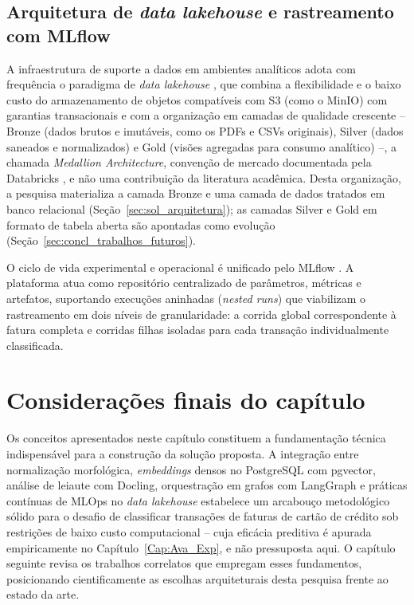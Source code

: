 \subsection{Arquitetura de \textit{data lakehouse} e rastreamento com MLflow}
A infraestrutura de suporte a dados em ambientes analíticos adota com frequência o paradigma de \textit{data lakehouse} \cite{armbrust2021lakehouse}, que combina a flexibilidade e o baixo custo do armazenamento de objetos compatíveis com S3 (como o MinIO) com garantias transacionais e com a organização em camadas de qualidade crescente -- Bronze (dados brutos e imutáveis, como os PDFs e CSVs originais), Silver (dados saneados e normalizados) e Gold (visões agregadas para consumo analítico) --, a chamada \textit{Medallion Architecture}, convenção de mercado documentada pela Databricks \cite{databricks2026medallion}, e não uma contribuição da literatura acadêmica. Desta organização, a pesquisa materializa a camada Bronze e uma camada de dados tratados em banco relacional (Seção~\ref{sec:sol_arquitetura}); as camadas Silver e Gold em formato de tabela aberta são apontadas como evolução (Seção~\ref{sec:concl_trabalhos_futuros}).

O ciclo de vida experimental e operacional é unificado pelo MLflow \cite{zaharia2018mlflow, treveil2020mlops}. A plataforma atua como repositório centralizado de parâmetros, métricas e artefatos, suportando execuções aninhadas (\textit{nested runs}) que viabilizam o rastreamento em dois níveis de granularidade: a corrida global correspondente à fatura completa e corridas filhas isoladas para cada transação individualmente classificada.

\section{Considerações finais do capítulo}
\label{sec:fund_consideracoes_finais}

Os conceitos apresentados neste capítulo constituem a fundamentação técnica indispensável para a construção da solução proposta. A integração entre normalização morfológica, \textit{embeddings} densos no PostgreSQL com pgvector, análise de leiaute com Docling, orquestração em grafos com LangGraph e práticas contínuas de MLOps no \textit{data lakehouse} estabelece um arcabouço metodológico sólido para o desafio de classificar transações de faturas de cartão de crédito sob restrições de baixo custo computacional -- cuja eficácia preditiva é apurada empiricamente no Capítulo~\ref{Cap:Ava_Exp}, e não pressuposta aqui. O capítulo seguinte revisa os trabalhos correlatos que empregam esses fundamentos, posicionando cientificamente as escolhas arquiteturais desta pesquisa frente ao estado da arte.
